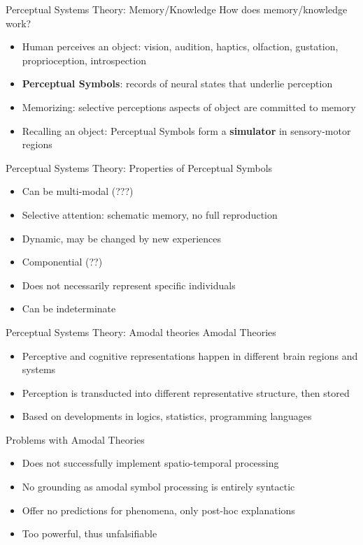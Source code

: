 \documentclass[12pt,a4paper]{beamer}
\begin{document}
\begin{frame}{Perceptual Systems Theory: Memory/Knowledge}
How does memory/knowledge work?
\begin{itemize}
\item Human perceives an object: vision, audition, haptics, olfaction, gustation, proprioception, introspection
\item \textbf{Perceptual Symbols}: records of neural states that underlie perception
\item Memorizing: selective perceptions aspects of object are committed to memory
\item Recalling an object: Perceptual Symbols form a \textbf{simulator} in sensory-motor regions
\end{itemize}
\end{frame}

\begin{frame}{Perceptual Systems Theory: Properties of Perceptual Symbols}
\begin{itemize}
\item Can be multi-modal (???)
\item Selective attention: schematic memory, no full reproduction
\item Dynamic, may be changed by new experiences
\item Componential (??)
\item Does not necessarily represent specific individuals
\item Can be indeterminate
\end{itemize}
\end{frame}


\begin{frame}{Perceptual Systems Theory: Amodal theories }
Amodal Theories
\begin{itemize}
\item Perceptive and cognitive representations happen in different brain regions and systems
\item Perception is transducted into different representative structure, then stored
\item Based on developments in logics, statistics, programming languages
\end{itemize}
Problems with Amodal Theories
\begin{itemize}
\item Does not successfully implement spatio-temporal processing
\item No grounding as amodal symbol processing is entirely syntactic
\item Offer no predictions for phenomena, only post-hoc explanations
\item Too powerful, thus unfalsifiable
\end{itemize}

\end{frame}
\end{document}
